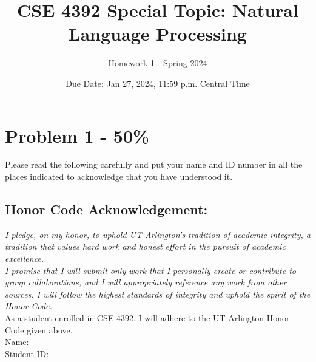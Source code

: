 \documentclass{article}
\begin{document}
\title{CSE 4392 Special Topic: Natural Language Processing}
\author{Homework 1 - Spring 2024}
\date{Due Date: Jan 27, 2024, 11:59 p.m. Central Time}
\maketitle
\thispagestyle{fancy}


\section*{Problem 1 - 50\%}

Please read the following carefully and put your name and ID number
in all the places indicated to acknowledge that you have understood it.

\subsection*{Honor Code Acknowledgement:}
\textit{I pledge, on my honor, to uphold UT Arlington’s tradition of academic integrity, a tradition that
values hard work and honest effort in the pursuit of academic excellence.\\
\newline
I promise that I will submit only work that I personally create or contribute to group collaborations,
and I will appropriately reference any work from other sources. I will follow the highest standards
of integrity and uphold the spirit of the Honor Code.}\\
\newline
As a student enrolled in CSE 4392, I will adhere to the UT Arlington Honor Code given above.\\
\newline
Name:\\
Student ID:\\
\end{document}
